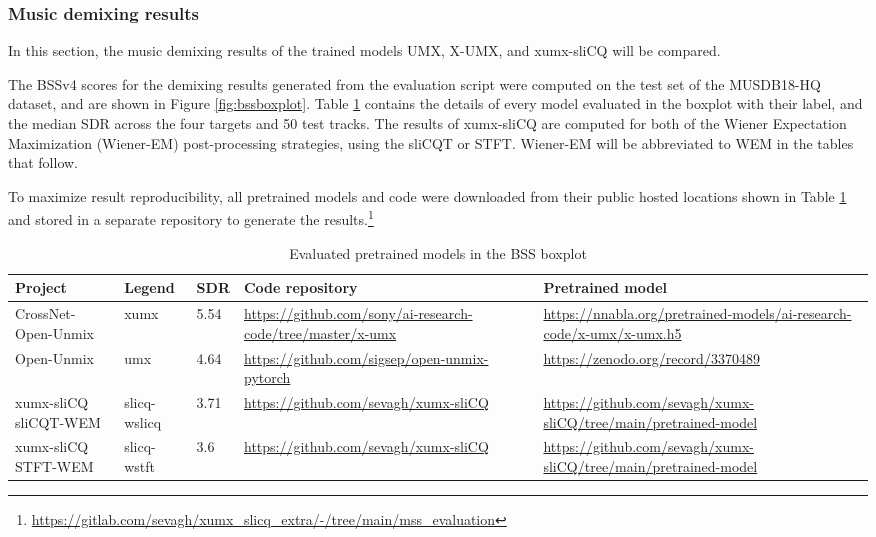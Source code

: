 \documentclass[report.tex]{subfiles}
\begin{document}
\subsubsection{Music demixing results}
\label{sec:demixresults}

In this section, the music demixing results of the trained models UMX, X-UMX, and xumx-sliCQ will be compared.

The BSSv4 scores for the demixing results generated from the evaluation script were computed on the test set of the MUSDB18-HQ dataset, and are shown in Figure \ref{fig:bssboxplot}. Table \ref{table:bsseval} contains the details of every model evaluated in the boxplot with their label, and the median SDR across the four targets and 50 test tracks. The results of xumx-sliCQ are computed for both of the Wiener Expectation Maximization (Wiener-EM) post-processing strategies, using the sliCQT or STFT. Wiener-EM will be abbreviated to WEM in the tables that follow.

To maximize result reproducibility, all pretrained models and code were downloaded from their public hosted locations shown in Table \ref{table:bsseval} and stored in a separate repository to generate the results.\footnote{\url{https://gitlab.com/sevagh/xumx_slicq_extra/-/tree/main/mss_evaluation}}

\begin{table}[ht]
	\centering
	\caption{Evaluated pretrained models in the BSS boxplot}
	\label{table:bsseval}
	\begin{tabular}{ |p{2.5cm}|l|l|p{3.5cm}|p{3.5cm}| }
	 \hline
		Project & Legend & SDR & Code repository & Pretrained model \\
	 \hline
	 \hline
		CrossNet-Open-Unmix & xumx & 5.54 & \url{https://github.com/sony/ai-research-code/tree/master/x-umx} & \url{https://nnabla.org/pretrained-models/ai-research-code/x-umx/x-umx.h5} \\
	 \hline
		Open-Unmix & umx & 4.64 & \url{https://github.com/sigsep/open-unmix-pytorch} & \url{https://zenodo.org/record/3370489} \\
	 \hline
		\makecell[l]{xumx-sliCQ \\ sliCQT-WEM} & slicq-wslicq & 3.71 & \url{https://github.com/sevagh/xumx-sliCQ} & \url{https://github.com/sevagh/xumx-sliCQ/tree/main/pretrained-model} \\
	 \hline
		\makecell[l]{xumx-sliCQ \\ STFT-WEM} & slicq-wstft & 3.6 & \url{https://github.com/sevagh/xumx-sliCQ} & \url{https://github.com/sevagh/xumx-sliCQ/tree/main/pretrained-model} \\
	 \hline
\end{tabular}
\end{table}
\end{document}
